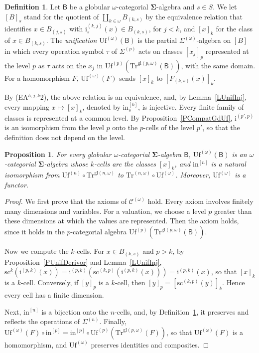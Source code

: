 \documentclass[a4paper,reqno]{amsart}
\newcommand{\sig}[1]{\mathbf{#1}}                %
\newcommand{\calg}[1]{\boldsymbol{\mathsf{#1}}}  %
\newcommand{\gl}{\mathrm{gl}}
\newcommand{\src}{\mathrm{sc}}
\newcommand{\ii}{\mathrm{i}}
\newcommand{\Uf}{\mathrm{Uf}}
\newcommand{\Tr}{\mathrm{Tr}}
\theoremstyle{plain}
\newtheorem{proposition}[theorem]{Proposition}
\theoremstyle{definition}
\newtheorem{definition}[theorem]{Definition}
\begin{document}
\begin{definition}\label{DUfOmega}
Let $\calg{B}$ be a globular $\omega$-categorial $\sig{\Sigma}$-algebra and $s\in S$.
We let $[B]_{s}$ stand for the quotient of $\coprod_{k\in\omega}B_{(k,s)}$ by the equivalence relation that identifies $x\in B_{(j,s)}$ with $\ii^{(k,j)}_{s}(x)\in B_{(k,s)}$, for $j<k$, and $[x]_{k}$ for the class of $x\in B_{(k,s)}$.
The \emph{unification} $\Uf^{(\omega)}(\calg{B})$ is the partial $\Sigma^{(\omega)}$-algebra on $[B]$ in which every operation symbol $\tau$ of $\Sigma^{(p)}$ acts on classes $[x_{j}]_{p}$ represented at the level $p$ as $\tau$ acts on the $x_{j}$ in $\Uf^{(p)}(\Tr^{\gl(p,\omega)}(\calg{B}))$, with the same domain.
For a homomorphism $F$, $\Uf^{(\omega)}(F)$ sends $[x]_{k}$ to $[F_{(k,s)}(x)]_{k}$.
\end{definition}

By (EA$^{h,j,k}$2), the above relation is an equivalence, and, by Lemma~\ref{LUnifInj}, every mapping $x\mapsto[x]_{k}$, denoted by $\mathrm{in}^{[k]}_{s}$, is injective.
Every finite family of classes is represented at a common level.
By Proposition~\ref{PCompatGdUf}, $\ii^{(p',p)}$ is an isomorphism from the level $p$ onto the $p$-cells of the level $p'$, so that the definition does not depend on the level.

\begin{proposition}\label{PUfOmega}
For every globular $\omega$-categorial $\sig{\Sigma}$-algebra $\calg{B}$, $\Uf^{(\omega)}(\calg{B})$ is an $\omega$-categorial $\sig{\Sigma}$-algebra whose $k$-cells are the classes $[x]_{k}$, and $\mathrm{in}^{[n]}$ is a natural isomorphism from $\Uf^{(n)}\circ\Tr^{\gl(n,\omega)}$ to $\Tr^{(n,\omega)}\circ\Uf^{(\omega)}$.
Moreover, $\Uf^{(\omega)}$ is a functor.
\end{proposition}
\begin{proof}
We first prove that the axioms of $\mathcal{C}^{(\omega)}$ hold.
Every axiom involves finitely many dimensions and variables.
For a valuation, we choose a level $p$ greater than these dimensions at which the values are represented.
Then the axiom holds, since it holds in the $p$-categorial algebra $\Uf^{(p)}(\Tr^{\gl(p,\omega)}(\calg{B}))$.

Now we compute the $k$-cells.
For $x\in B_{(k,s)}$ and $p>k$, by Proposition~\ref{PUnifDerivor} and Lemma~\ref{LUnifInj}, $\src^{k}(\ii^{(p,k)}(x))=\ii^{(p,k)}(\src^{(k,p)}(\ii^{(p,k)}(x)))=\ii^{(p,k)}(x)$, so that $[x]_{k}$ is a $k$-cell.
Conversely, if $[y]_{p}$ is a $k$-cell, then $[y]_{p}=[\src^{(k,p)}(y)]_{k}$.
Hence every cell has a finite dimension.

Next, $\mathrm{in}^{[n]}$ is a bijection onto the $n$-cells, and, by Definition~\ref{DUfOmega}, it preserves and reflects the operations of $\Sigma^{(n)}$.
Finally, $\Uf^{(\omega)}(F)\circ\mathrm{in}^{[p]}=\mathrm{in}^{[p]}\circ\Uf^{(p)}(\Tr^{\gl(p,\omega)}(F))$, so that $\Uf^{(\omega)}(F)$ is a homomorphism, and $\Uf^{(\omega)}$ preserves identities and composites.
\end{proof}
\end{document}
